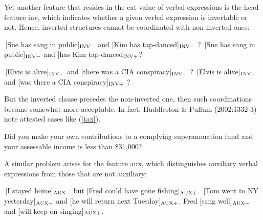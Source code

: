 \documentclass[output=paper]{langsci/langscibook}
\begin{document}
Yet another feature that resides in the {\sc cat} value of verbal expressions is the head feature {\sc inv}, which indicates whether a given verbal expression is invertable or not. Hence, inverted structures cannot be coordinated with non-inverted ones:


\begin{exe}
\ex
\begin{xlista}
\ex \,[Sue has sang in public]$_{\textup{\scriptsize INV} -}$ and [Kim has tap-danced]$_{\textup{\scriptsize INV} -}$ ?
\ex{*}\,[Sue has sang in public]$_{\textup{\scriptsize INV} -}$ and [has Kim tap-danced$_{\textup{\scriptsize INV} +}$?
\end{xlista}
\end{exe}

\begin{exe}
\ex \begin{xlista}
\ex \,[Elvis is alive]$_{\textup{\scriptsize INV} -}$ and [there was a CIA conspiracy]$_{\textup{\scriptsize INV} -}$ ?
\ex{*}\,[Elvis is alive]$_{\textup{\scriptsize INV} -}$ and [was there a CIA conspiracy]$_{\textup{\scriptsize INV} +}$ ?
\end{xlista}
\end{exe}

\noindent
But the inverted clause precedes the non-inverted one, then such coordinations become somewhat more acceptable. In fact, 
Huddleston  \& Pullum (2002:1332-3) note attested cases like 
(\ref{tax}).

\begin{exe}
\ex Did you make your own contributions to a complying superannuation fund and
your assessable income is less than \$31,000?\label{tax}
\end{exe}

\noindent
A similar problem arises for the feature {\sc aux}, which distinguishes auxiliary verbal expressions from those that
are not auxiliary:

\begin{exe}
\ex
\begin{xlista}
\ex \,[I stayed home]$_{\textup{\scriptsize AUX} -}$ but [Fred could have gone fishing]$_{\textup{\scriptsize AUX} +}$.
\ex \,[Tom went to NY yesterday]$_{\textup{\scriptsize AUX} -}$ and [he will return next Tuesday]$_{\textup{\scriptsize AUX} +}$.
\ex Fred [sang well]$_{\textup{\scriptsize AUX} -}$ and [will keep on singing]$_{\textup{\scriptsize AUX} +}$.
\end{xlista}\label{aux}
\end{exe}
\end{document}
